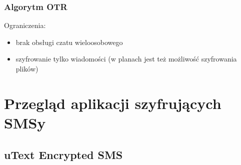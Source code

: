 \documentclass[xcolor=table]{beamer}
\begin{document}
\begin{frame}
  \frametitle{Algorytm OTR}
  
Ograniczenia:
\begin{itemize}
\item brak obsługi czatu wieloosobowego
\item szyfrowanie tylko wiadomości (w planach jest też możliwość szyfrowania plików)
\end{itemize}
\end{frame}

\section{Przegląd aplikacji szyfrujących SMSy}

\subsection{uText Encrypted SMS}
\end{document}
